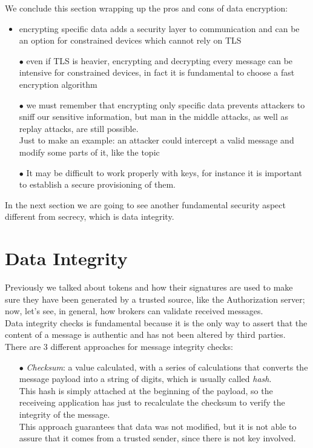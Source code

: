 \documentclass[12pt]{report}
\begin{document}
{We conclude this section wrapping up the pros and cons of data encryption:

\begin{itemize}
\setlength{\itemindent}{+4mm}
\item encrypting specific data adds a security layer to communication and can be an option for constrained devices which cannot rely on TLS
\item[$\bullet$] even if TLS is heavier, encrypting and decrypting every message can be intensive for constrained devices, in fact it is fundamental to choose a fast encryption algorithm
\item[$\bullet$] we must remember that encrypting only specific data prevents attackers to sniff our sensitive information, but man in the middle attacks, as well as replay attacks, are still possible.\\ 
Just to make an example: an attacker could intercept a valid message and modify some parts of it, like the topic
\item[$\bullet$] It may be difficult to work properly with keys, for instance it is important to establish a secure provisioning of them.
\end{itemize}
\bigskip
In the next section we are going to see another fundamental security aspect different from secrecy, which is data integrity.\\

\section{Data Integrity}
\bigskip

Previously we talked about tokens and how their signatures are used to make sure they have been generated by a trusted source, like the Authorization server; now, let's see, in general, how brokers can validate received messages.\\
Data integrity checks is fundamental because it is the only way to assert that the content of a message is authentic and has not been altered by third parties.\\
There are 3 different approaches for message integrity checks:

\begin{itemize}
\setlength{\itemindent}{+4mm}
\item[$\bullet$] \emph{Checksum}: a value calculated, with a series of calculations that converts the message payload into a string of digits, which is usually called \emph{hash}.\\
This hash is simply attached at the beginning of the payload, so the receiveing application has just to recalculate the checksum to verify the integrity of the message.\\
This approach guarantees that data was not modified, but it is not able to assure that it comes from a trusted sender, since there is not key involved.


\end{itemize}}
\end{document}
